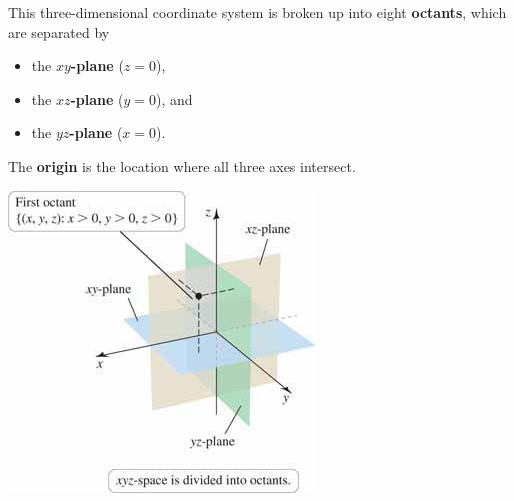 \documentclass[mathNotesPreamble]{subfiles}
\begin{document}
    \begin{defn*}
      \begin{minipage}{0.5\linewidth}
        This three-dimensional coordinate system is broken up into eight \textbf{octants}, which are separated by
        \begin{itemize}
          \item the \textbf{$xy$-plane} ($z=0$),
          \item the \textbf{$xz$-plane} ($y=0$), and
          \item the \textbf{$yz$-plane} ($x=0$).
        \end{itemize}
           The \textbf{origin} is the location where all three axes intersect.
      \end{minipage}%
      \begin{minipage}{0.5\linewidth}
        \vspace*{-\baselineskip}
        \begin{flushright}
          \includegraphics[width=0.85\linewidth]{images/briggs_13_02/fig13_26}
        \end{flushright}
      \end{minipage}%
    \end{defn*}
    \pagebreak
\end{document}
